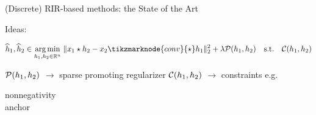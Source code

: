\begin{frame}{(Discrete) RIR-based methods: the State of the Art \hfill\faBook}
\begin{block}{Ideas:}
\begin{enumerate}
        \pause[6]
        \vspace*{2mm}
        \begin{mysotablock}
            \begin{equation*}
                \widehat{\discRIR}_1, \widehat{\discRIR}_2 \in
                \underset{\discRIR_1, \discRIR_2\in\kR^n}{\arg\min}\;
                \Vert \discMic_1 \discConv \discRIR_2 - \discMic_2 \tikzmarknode{conv}{\discConv} \discRIR_1 \Vert_2^2
                + \lambda \mathcal{P}(\discRIR_1, \discRIR_2)
                \quad\text{s.t.}\quad\mathcal{C}(\discRIR_1, \discRIR_2)
            \end{equation*}

            \vspace*{-2mm}
            \begin{center}
                \footnotesize
                $\mathcal{P}(h_1, h_2)$ $\longrightarrow$ sparse promoting regularizer
                \hspace{5mm} \footnotesize $\mathcal{C}(h_1, h_2)$ $\longrightarrow$ constraints e.g. \parbox{6em}{nonnegativity\\anchor}
            \end{center}
        \end{mysotablock}

    \end{enumerate}
    \end{block}

    \pause[7]
    \vspace{-12mm}
    \begin{block}{}
        \begin{center}
            \small
            \textcolor{mygreen}{\cmark}  \cite{tong1994blind} \qquad \textcolor{mygreen}{\cmark}  \cite{lin2008blind} \qquad \textcolor{mygreen}{\cmark} \cite{aissa2008blind} \\
            \textcolor{mygreen}{\cmark} \cite{kowalczyk2013blind} \qquad \textcolor{mygreen}{\cmark} \cite{crocco2016estimation}
        \end{center}
    \end{block}

 \end{frame}


